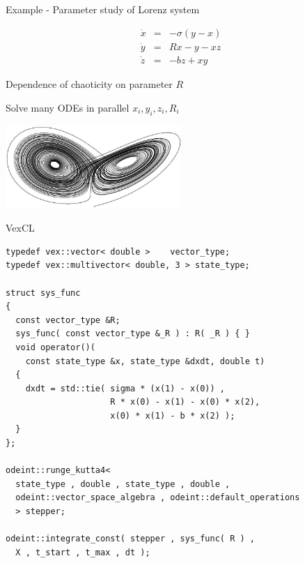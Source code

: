 \documentclass{beamer}
\newcommand{\heading}[1]{\centerline{\Large #1} \vspace{0.5em}}
\begin{document}
\begin{frame}[fragile]
 \heading{Example - Parameter study of Lorenz system}

\begin{eqnarray*}
\dot{x} & = & - \sigma ( y - x ) \\
\dot{y} & = & R x - y - x z \\
\dot{z} & = & - b z + x y
\end{eqnarray*}

Dependence of chaoticity on parameter $R$

\vspace{2ex}

Solve many ODEs in parallel $x_i,y_i,z_i,R_i$

\vspace{2ex}

\centerline{\includegraphics[draft=false,width=0.5\textwidth]{lorenz.jpg}}

\end{frame}


\begin{frame}[fragile]
 \heading{VexCL}

\begin{lstlisting}[basicstyle=\scriptsize\ttfamily]
typedef vex::vector< double >    vector_type;
typedef vex::multivector< double, 3 > state_type;

struct sys_func
{
  const vector_type &R;
  sys_func( const vector_type &_R ) : R( _R ) { }
  void operator()(
    const state_type &x, state_type &dxdt, double t)
  {
    dxdt = std::tie( sigma * (x(1) - x(0)) ,
                     R * x(0) - x(1) - x(0) * x(2),
                     x(0) * x(1) - b * x(2) );
  }
};

odeint::runge_kutta4<
  state_type , double , state_type , double ,
  odeint::vector_space_algebra , odeint::default_operations
  > stepper;

odeint::integrate_const( stepper , sys_func( R ) ,
  X , t_start , t_max , dt );

\end{lstlisting}

\end{frame}
\end{document}
